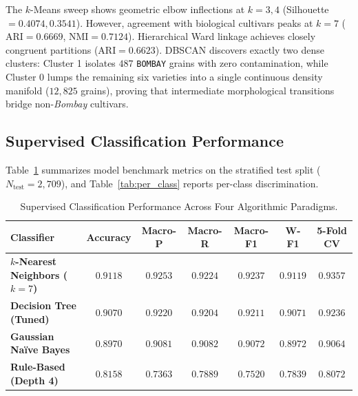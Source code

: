 \documentclass[11pt,a4paper]{article}
\begin{document}
The $k$-Means sweep shows geometric elbow inflections at $k = 3, 4$ (Silhouette $= 0.4074, 0.3541$). However, agreement with biological cultivars peaks at $k = 7$ ($\text{ARI} = 0.6669$, $\text{NMI} = 0.7124$). Hierarchical Ward linkage achieves closely congruent partitions ($\text{ARI} = 0.6623$). DBSCAN discovers exactly two dense clusters: Cluster 1 isolates $487$ \texttt{BOMBAY} grains with zero contamination, while Cluster 0 lumps the remaining six varieties into a single continuous density manifold ($12{,}825$ grains), proving that intermediate morphological transitions bridge non-\textit{Bombay} cultivars.

\subsection{Supervised Classification Performance}
\label{subsec:res_classification}

Table~\ref{tab:classification} summarizes model benchmark metrics on the stratified test split ($N_{\text{test}} = 2{,}709$), and Table~\ref{tab:per_class} reports per-class discrimination.

\begin{table}[htbp]
    \centering
    \small
    \caption{Supervised Classification Performance Across Four Algorithmic Paradigms.}
    \label{tab:classification}
    \setlength{\tabcolsep}{5pt}
    \begin{tabularx}{\linewidth}{@{} >{\raggedright\arraybackslash}X cccccc @{}}
        \toprule
        \textbf{Classifier} & \textbf{Accuracy} & \textbf{Macro-P} & \textbf{Macro-R} & \textbf{Macro-F1} & \textbf{W-F1} & \textbf{5-Fold CV} \\
        \midrule
        \textbf{$k$-Nearest Neighbors ($k=7$)} & $\mathbf{0.9118}$ & $\mathbf{0.9253}$ & $\mathbf{0.9224}$ & $\mathbf{0.9237}$ & $\mathbf{0.9119}$ & $\mathbf{0.9357}$ \\
        \textbf{Decision Tree (Tuned)} & $0.9070$ & $0.9220$ & $0.9204$ & $0.9211$ & $0.9071$ & $0.9236$ \\
        \textbf{Gaussian Naïve Bayes} & $0.8970$ & $0.9081$ & $0.9082$ & $0.9072$ & $0.8972$ & $0.9064$ \\
        \textbf{Rule-Based (Depth 4)} & $0.8158$ & $0.7363$ & $0.7889$ & $0.7520$ & $0.7839$ & $0.8072$ \\
        \bottomrule
    \end{tabularx}
\end{table}
\end{document}
